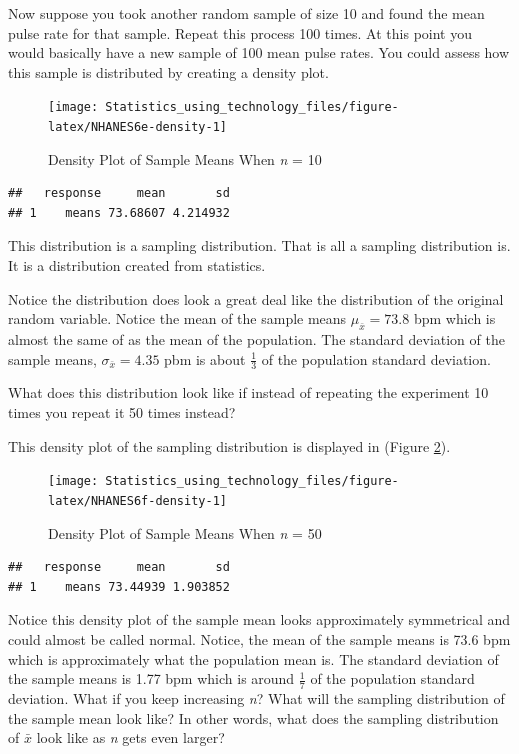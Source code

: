 \documentclass[
]{book}
\begin{document}
Now suppose you took another random sample of size 10 and found the mean pulse rate for that sample. Repeat this process 100 times. At this point you would basically have a new sample of 100 mean pulse rates. You could assess how this sample is distributed by creating a density plot.



\begin{figure}
\texttt{[image: Statistics\_using\_technology\_files/figure-latex/NHANES6e-density-1]} \caption{Density Plot of Sample Means When \emph{n} = 10}\label{fig:NHANES6e-density}
\end{figure}

\begin{verbatim}
##   response     mean       sd
## 1    means 73.68607 4.214932
\end{verbatim}

This distribution is a sampling distribution. That is all a sampling distribution is. It is a distribution created from statistics.

Notice the distribution does look a great deal like the distribution of the original random variable. Notice the mean of the sample means \(\mu_{\bar{x}} = 73.8\) bpm which is almost the same of as the mean of the population. The standard deviation of the sample means, \(\sigma_{\bar{x}}=4.35\) pbm is about \(\frac{1}{3}\) of the population standard deviation.

What does this distribution look like if instead of repeating the experiment 10 times you repeat it 50 times instead?

This density plot of the sampling distribution is displayed in (Figure \ref{fig:NHANES6f-density}).



\begin{figure}
\texttt{[image: Statistics\_using\_technology\_files/figure-latex/NHANES6f-density-1]} \caption{Density Plot of Sample Means When \emph{n} = 50}\label{fig:NHANES6f-density}
\end{figure}

\begin{verbatim}
##   response     mean       sd
## 1    means 73.44939 1.903852
\end{verbatim}

Notice this density plot of the sample mean looks approximately symmetrical and could almost be called normal. Notice, the mean of the sample means is 73.6 bpm which is approximately what the population mean is. The standard deviation of the sample means is 1.77 bpm which is around \(\frac{1}{7}\) of the population standard deviation. What if you keep increasing \emph{n}? What will the sampling distribution of the sample mean look like? In other words, what does the sampling distribution of \(\bar{x}\) look like as \emph{n} gets even larger?
\end{document}
